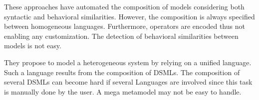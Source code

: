 These approaches have automated the composition of models considering both syntactic and behavioral similarities. However, the composition is always specified between homogeneous languages. Furthermore, operators are encoded thus not enabling any customization. The detection of behavioral similarities between models is not easy. 

They propose to model a heterogeneous system by relying on a unified language. Such a language results from the composition of DSMLs. The composition of several DSMLs can become hard if several Languages are involved since this task is manually done by the user. A mega metamodel may not be easy to handle. 




